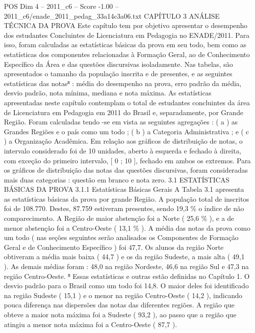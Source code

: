 \begin{textsample}{POS Dim 4 – 2011\_c6 – Score -1.00 – 2011\_c6/enade\_2011\_pedag\_33a14c3a06.txt}  \label{ex:f4_pos_304}
CAPÍTULO 3 ANÁLISE TÉCNICA DA PROVA Este capítulo tem por objetivo apresentar o desempenho dos estudantes Concluintes de Licenciatura em Pedagogia no ENADE/2011.
Para isso, foram calculadas as estatísticas básicas da prova em seu todo, bem como as estatísticas dos componentes relacionadas à Formação Geral, ao de Conhecimento Específico da Área e das questões discursivas isoladamente.
Nas tabelas, são apresentados o tamanho da população inscrita e de presentes, e as seguintes estatísticas das notas⁸ : média do desempenho na prova, erro padrão da média, desvio padrão, nota mínima, mediana e nota máxima.
As estatísticas apresentadas neste capítulo contemplam o total de estudantes concluintes da área de Licenciatura em Pedagogia em 2011 do Brasil e, separadamente, por Grande Região.
Foram calculadas tendo -se em vista as seguintes agregações : ( a ) as Grandes Regiões e o país como um todo ; ( b ) a Categoria Administrativa ; e ( c ) a Organização Acadêmica.
Em relação aos gráficos de distribuição de notas, o intervalo considerado foi de 10 unidades, aberto à esquerda e fechado à direita, com exceção do primeiro intervalo, [ 0 ; 10 ], fechado em ambos os extremos.
Para os gráficos de distribuição das notas das questões discursivas, foram consideradas mais duas categorias : questão em branco e nota zero. 3.1 ESTATÍSTICAS BÁSICAS DA PROVA 3.1.1 Estatísticas Básicas Gerais A Tabela 3.1 apresenta as estatísticas básicas da prova por grande Região.
A população total de inscritos foi de 108.770.
Destes, 87.759 estiveram presentes, sendo 19,3 \% o índice de não comparecimento.
A Região de maior abstenção foi a Norte ( 25,6 \% ), e a de menor abstenção foi a Centro-Oeste ( 13,1 \% ).
A média das notas da prova como um todo ( nas seções seguintes serão analisados os Componentes de Formação Geral e de Conhecimento Específico ) foi 47,7.
Os alunos da região Norte obtiveram a média mais baixa ( 44,7 ) e os da região Sudeste, a mais alta ( 49,1 ).
As demais médias foram : 48,0 na região Nordeste, 46,6 na região Sul e 47,3 na região Centro-Oeste. ⁸ Essas estatísticas e outras estão definidas no Capítulo 1.
O desvio padrão para o Brasil como um todo foi 14,8.
O maior deles foi identificado na região Sudeste ( 15,1 ) e o menor na região Centro-Oeste ( 14,2 ), indicando pouca diferença nas dispersões das notas das diferentes regiões.
A região que obteve a maior nota máxima foi a Sudeste ( 93,2 ), ao passo que a região que atingiu a menor nota máxima foi a Centro-Oeste ( 87,7 ).

\end{textsample}

